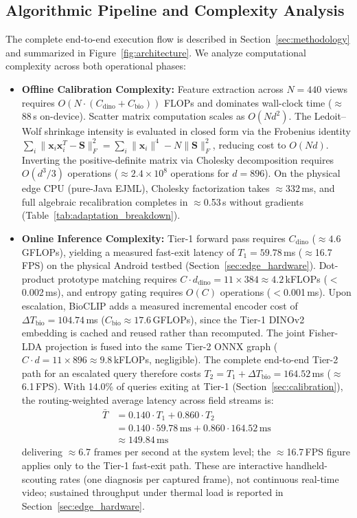 \documentclass[preprint,12pt]{elsarticle}
\begin{document}
\subsection{Algorithmic Pipeline and Complexity Analysis}
\label{sec:complexity}
The complete end-to-end execution flow is described in Section~\ref{sec:methodology} and summarized in Figure~\ref{fig:architecture}. We analyze computational complexity across both operational phases:
\begin{itemize}
    \item \textbf{Offline Calibration Complexity:} Feature extraction across $N=440$ views requires $O(N \cdot (C_{\text{dino}} + C_{\text{bio}}))$ FLOPs and dominates wall-clock time ($\approx$88\,s on-device). Scatter matrix computation scales as $O(N d^2)$. The Ledoit--Wolf shrinkage intensity is evaluated in closed form via the Frobenius identity $\sum_i \|\mathbf{x}_i \mathbf{x}_i^T - \mathbf{S}\|_F^2 = \sum_i \|\mathbf{x}_i\|^4 - N \|\mathbf{S}\|_F^2$, reducing cost to $O(N d)$. Inverting the positive-definite matrix via Cholesky decomposition requires $O(d^3 / 3)$ operations ($\approx 2.4 \times 10^8$ operations for $d=896$). On the physical edge CPU (pure-Java EJML), Cholesky factorization takes $\approx$332\,ms, and full algebraic recalibration completes in $\approx$0.53\,s without gradients (Table~\ref{tab:adaptation_breakdown}).
    \item \textbf{Online Inference Complexity:} Tier-1 forward pass requires $C_{\text{dino}}$ ($\approx 4.6$\,GFLOPs), yielding a measured fast-exit latency of $T_1 = 59.78$\,ms ($\approx$16.7\,FPS) on the physical Android testbed (Section~\ref{sec:edge_hardware}). Dot-product prototype matching requires $C \cdot d_{\text{dino}} = 11 \times 384 \approx 4.2$\,kFLOPs ($<$0.002\,ms), and entropy gating requires $O(C)$ operations ($<$0.001\,ms). Upon escalation, BioCLIP adds a measured incremental encoder cost of $\Delta T_{\text{bio}} = 104.74$\,ms ($C_{\text{bio}} \approx 17.6$\,GFLOPs), since the Tier-1 DINOv2 embedding is cached and reused rather than recomputed. The joint Fisher-LDA projection is fused into the same Tier-2 ONNX graph ($C \cdot d = 11 \times 896 \approx 9.8$\,kFLOPs, negligible). The complete end-to-end Tier-2 path for an escalated query therefore costs $T_2 = T_1 + \Delta T_{\text{bio}} = 164.52$\,ms ($\approx$6.1\,FPS). With 14.0\% of queries exiting at Tier-1 (Section~\ref{sec:calibration}), the routing-weighted average latency across field streams is:
    \begin{align}
        \bar{T} &= 0.140 \cdot T_1 + 0.860 \cdot T_2 \nonumber \\
        &= 0.140 \cdot 59.78\,\text{ms} + 0.860 \cdot 164.52\,\text{ms} \nonumber \\
        &\approx 149.84\,\text{ms}
    \end{align}
    delivering $\approx$6.7 frames per second at the system level; the $\approx$16.7\,FPS figure applies only to the Tier-1 fast-exit path. These are interactive handheld-scouting rates (one diagnosis per captured frame), not continuous real-time video; sustained throughput under thermal load is reported in Section~\ref{sec:edge_hardware}.
\end{itemize}
\end{document}
